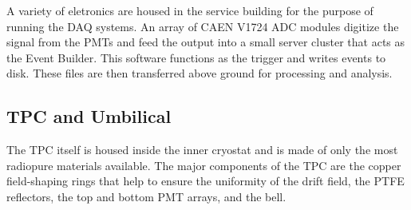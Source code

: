 A variety of eletronics are housed in the service building for the purpose of running the DAQ systems. An array of CAEN V1724 ADC modules digitize the signal from the PMTs and feed the output into a small server cluster that acts as the Event Builder. This software functions as the trigger and writes events to disk. These files are then transferred above ground for processing and analysis.

\subsection{TPC and Umbilical}

The TPC itself is housed inside the inner cryostat and is made of only the most radiopure materials available. The major components of the TPC are the copper field-shaping rings that help to ensure the uniformity of the drift field, the PTFE reflectors, the top and bottom PMT arrays, and the bell.